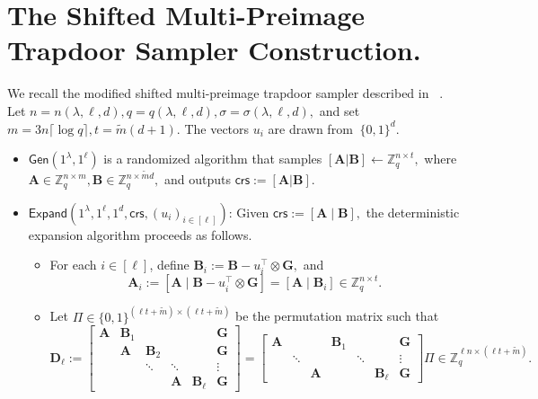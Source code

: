 \section{The Shifted Multi-Preimage Trapdoor Sampler Construction.}
We recall the modified shifted multi-preimage trapdoor sampler described in ~\cite[Construction~B.3]{EPRINT:BonLauTas25}.
\label{ap:1}
Let
$
    n=n(\lambda,\ell,d),
    q=q(\lambda,\ell,d),
    \sigma=\sigma(\lambda,\ell,d),
$
and set
$
    m = 3n\lceil \log q\rceil,
    t = \tilde{m}(d+1).
$
The vectors $u_i$ are drawn from
$\
    \{0,1\}^{d}.
$

\begin{itemize}
    \item 
    $\mathsf{Gen}(1^\lambda,1^\ell)$ is a randomized algorithm that samples
    $
        [\mathbf A |\mathbf B] \leftarrow \mathbb Z_q^{n\times t},
    $
    where
    $
        \mathbf A\in \mathbb Z_q^{n\times m},
        \mathbf B\in \mathbb Z_q^{n\times \tilde{m}d},
    $
    and outputs
    $
        \mathsf{crs}:=[\mathbf A| \mathbf B].
    $

    \item
    $\mathsf{Expand}(1^\lambda,1^\ell,1^d,\mathsf{crs},(u_i)_{i\in[\ell]})$:
    Given
    $
        \mathsf{crs}:=[\mathbf A\mid \mathbf B],
    $
    the deterministic expansion algorithm proceeds as follows.
    \begin{itemize}
        \item For each $i\in[\ell]$, define
    $
        \mathbf B_i := \mathbf B - u_i^\top \otimes \mathbf G,
    $
    and
    \[
        \mathbf A_i
        :=
        [\mathbf A \mid \mathbf B-u_i^\top\otimes \mathbf G]
        =
        [\mathbf A\mid \mathbf B_i]
        \in \mathbb Z_q^{n\times t}.
    \]

    \item Let
    $
        \Pi\in \{0,1\}^{(\ell t+\tilde{m})\times(\ell t+\tilde{m})}
    $
    be the permutation matrix such that
    \[
\mathbf{D}_\ell
:=
\left[
\begin{array}{ccccc|c}
    \mathbf A & \mathbf B_1 &             &             &              & \mathbf G \\
              & \mathbf A   & \mathbf B_2 &             &              & \mathbf G \\
              &             & \ddots      & \ddots      &              & \vdots    \\
              &             &             & \mathbf A   & \mathbf B_\ell & \mathbf G
\end{array}
\right]
=
\left[
\begin{array}{ccc|ccc|c}
    \mathbf A &        &           & \mathbf B_1 &        &              & \mathbf G \\
              & \ddots &           &              & \ddots &              & \vdots    \\
              &        & \mathbf A &              &        & \mathbf B_\ell & \mathbf G
\end{array}
\right]\Pi
\in \mathbb Z_q^{\ell n \times (\ell t+\tilde{m})} .
\]


\end{itemize}
\end{itemize}
